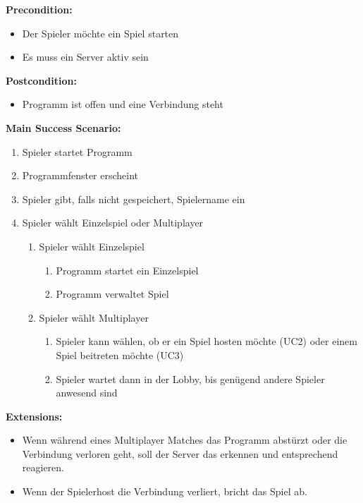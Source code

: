 \textbf{Precondition:}
\begin{itemize}
\item Der Spieler möchte ein Spiel starten 
\item Es muss ein Server aktiv sein
\end{itemize}


\textbf{Postcondition:}
\begin{itemize}
\item Programm ist offen und eine Verbindung steht
\end{itemize}


\textbf{Main Success Scenario:}

\begin{enumerate}
\item Spieler startet Programm
\item Programmfenster erscheint
\item Spieler gibt, falls nicht gespeichert, Spielername ein 
\item Spieler wählt Einzelspiel oder Multiplayer

\begin{enumerate}
\item Spieler wählt Einzelspiel

\begin{enumerate}
\item Programm startet ein Einzelspiel
\item Programm verwaltet Spiel
\end{enumerate}

\item Spieler wählt Multiplayer
\begin{enumerate}
\item Spieler kann wählen, ob er ein Spiel hosten möchte (UC2) oder einem Spiel beitreten möchte (UC3)
\item Spieler wartet dann in der Lobby, bis genügend andere Spieler anwesend sind
\end{enumerate}

\end{enumerate}

\end{enumerate}


\textbf{Extensions:}
\begin{itemize}
\item Wenn während eines Multiplayer Matches das Programm abstürzt oder die Verbindung verloren geht, soll der Server das erkennen und entsprechend reagieren.
\item Wenn der Spielerhost die Verbindung verliert, bricht das Spiel ab.
\end{itemize}

